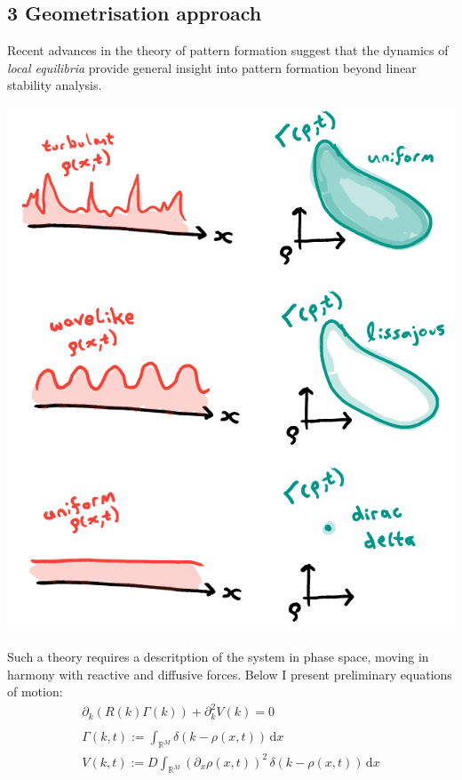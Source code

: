 \documentclass[a0,portrait]{a0poster}
\begin{document}
\begin{multicols}{3}
\section*{3 Geometrisation approach}
Recent advances in the theory of pattern formation \cite{Halatek2018} suggest that
the dynamics of \textit{local equilibria} provide general insight into pattern
formation beyond linear stability analysis.
\begin{center}
\includegraphics[width=0.99\linewidth]{motivation}
\end{center}
Such a theory requires a descritption of the system in phase space, moving in
harmony with reactive and diffusive forces. Below I present preliminary equations
of motion:\\
\large\begin{align*}
	\partial_k\left(R(k)\Gamma(k)\right)+\partial_k^2 V(k)=0\qquad\quad
	\\\\
	\Gamma(k,t):=\int_{\mathbb{R}^M}\!\delta(k-\rho(x,t))\,\mathrm{d}x\qquad\quad
	\\
	V(k,t):=D\int_{\mathbb{R}^M}\!
		(\partial_x\rho(x,t))^2\,\delta(k-\rho(x,t))\,\mathrm{d}x

\end{align*}
\end{multicols}
\end{document}
